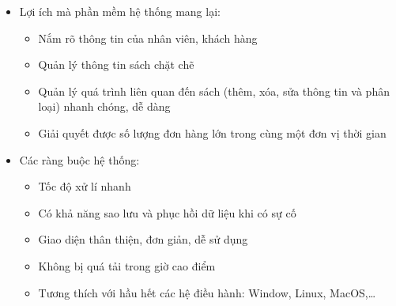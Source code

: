 \documentclass{report}
\begin{document}
\begin{enumerate}
\begin{itemize}
        \item Lợi ích mà phần mềm hệ thống mang lại:
        \begin{itemize}
            \item Nắm rõ thông tin của nhân viên, khách hàng
            \item Quản lý thông tin sách chặt chẽ
            \item Quản lý quá trình liên quan đến sách (thêm, xóa, sửa thông tin và phân loại) nhanh chóng, dễ dàng
            \item Giải quyết được số lượng đơn hàng lớn trong cùng một đơn vị thời gian
        \end{itemize}
        \pagebreak
        \item Các ràng buộc hệ thống:
        \begin{itemize}
            \item Tốc độ xử lí nhanh
            \item Có khả năng sao lưu và phục hồi dữ liệu khi có sự cố
            \item Giao diện thân thiện, đơn giản, dễ sử dụng
            \item Không bị quá tải trong giờ cao điểm
            \item Tương thích với hầu hết các hệ điều hành: Window, Linux, MacOS,…
        \end{itemize}
    \end{itemize}
\end{enumerate}
\end{document}
